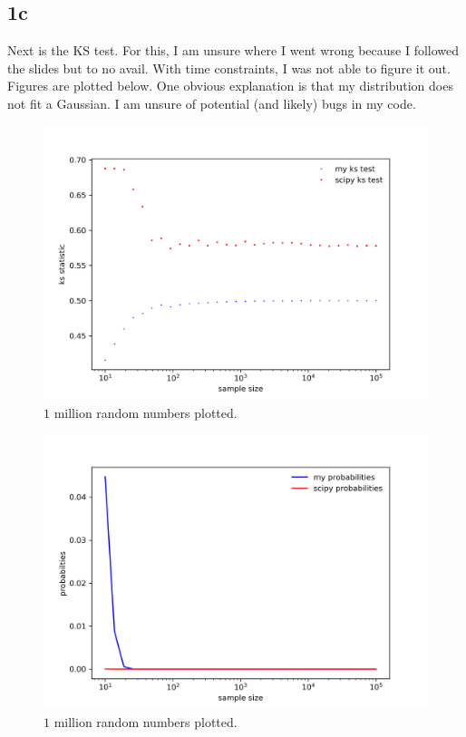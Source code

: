 \subsection{1c}


Next is the KS test. For this, I am unsure where I went wrong because
I followed the slides but to no avail. With time constraints, I was not
able to figure it out. Figures are plotted below. One obvious explanation
is that my distribution does not fit a Gaussian. I am unsure of potential
(and likely) bugs in my code.
\begin{figure}[h!]
    \centering
    \includegraphics[width=0.9\linewidth]{./plots/ks_stat.png}
    \caption{$1$ million random numbers plotted.}
    \label{plt3}
\end{figure}

\begin{figure}[h!]
    \centering
    \includegraphics[width=0.9\linewidth]{./plots/ks_prob.png}
    \caption{$1$ million random numbers plotted.}
    \label{plt3}
\end{figure}

